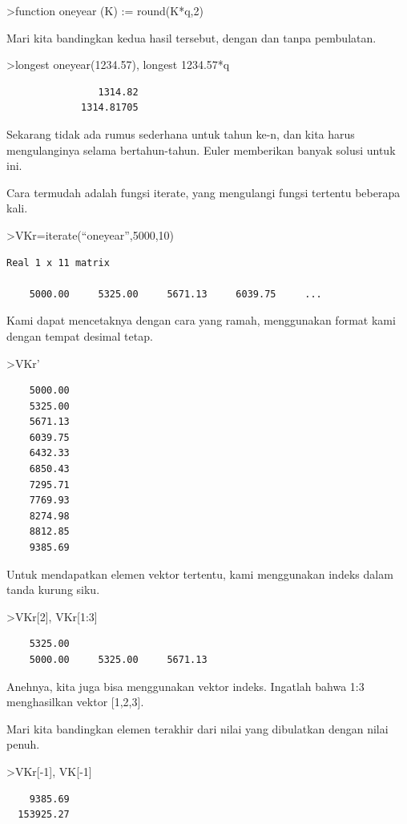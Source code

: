 \documentclass[
]{book}
\begin{document}
\textgreater function oneyear (K) := round(K*q,2)

Mari kita bandingkan kedua hasil tersebut, dengan dan tanpa pembulatan.

\textgreater longest oneyear(1234.57), longest 1234.57*q

\begin{verbatim}
                1314.82 
             1314.81705 
\end{verbatim}

Sekarang tidak ada rumus sederhana untuk tahun ke-n, dan kita harus mengulanginya selama bertahun-tahun. Euler memberikan banyak solusi untuk ini.

Cara termudah adalah fungsi iterate, yang mengulangi fungsi tertentu beberapa kali.

\textgreater VKr=iterate(``oneyear'',5000,10)

\begin{verbatim}
Real 1 x 11 matrix

    5000.00     5325.00     5671.13     6039.75     ...
\end{verbatim}

Kami dapat mencetaknya dengan cara yang ramah, menggunakan format kami dengan tempat desimal tetap.

\textgreater VKr'

\begin{verbatim}
    5000.00 
    5325.00 
    5671.13 
    6039.75 
    6432.33 
    6850.43 
    7295.71 
    7769.93 
    8274.98 
    8812.85 
    9385.69 
\end{verbatim}

Untuk mendapatkan elemen vektor tertentu, kami menggunakan indeks dalam tanda kurung siku.

\textgreater VKr{[}2{]}, VKr{[}1:3{]}

\begin{verbatim}
    5325.00 
    5000.00     5325.00     5671.13 
\end{verbatim}

Anehnya, kita juga bisa menggunakan vektor indeks. Ingatlah bahwa 1:3 menghasilkan vektor {[}1,2,3{]}.

Mari kita bandingkan elemen terakhir dari nilai yang dibulatkan dengan nilai penuh.

\textgreater VKr{[}-1{]}, VK{[}-1{]}

\begin{verbatim}
    9385.69 
  153925.27 
\end{verbatim}
\end{document}
